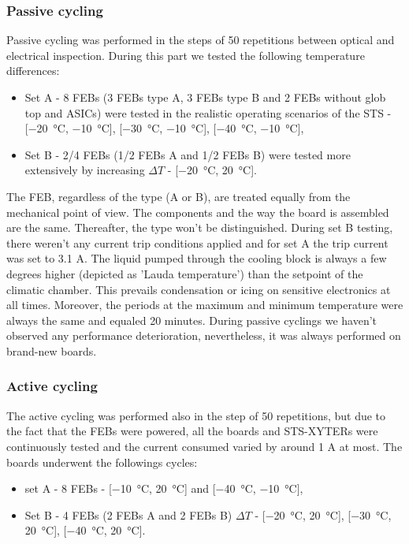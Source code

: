 \subsubsection{Passive cycling}
Passive cycling was performed in the steps of 50 repetitions between optical and electrical inspection. During this part we tested the following temperature differences:
\begin{itemize}
    \item Set A - 8 \glspl{FEB} (3 \glspl{FEB} type A, 3 \glspl{FEB} type B and 2 \glspl{FEB} without glob top and \glspl{ASIC}) were tested in the realistic operating scenarios of the \gls{STS} - [\SI{-20}{\celsius}, \SI{-10}{\celsius}], [\SI{-30}{\celsius}, \SI{-10}{\celsius}], [\SI{-40}{\celsius}, \SI{-10}{\celsius}],
    \item Set B - 2/4 \glspl{FEB} (1/2 \glspl{FEB} A and 1/2 \glspl{FEB} B) were tested more extensively by increasing $\Delta T$ - [\SI{-20}{\celsius}, \SI{20}{\celsius}].
\end{itemize}
The \gls{FEB}, regardless of the type (A or B), are treated equally from the mechanical point of view. The components and the way the board is assembled are the same. Thereafter, the type won't be distinguished. During set B testing, there weren't any current trip conditions applied and for set A the trip current was set to 3.1 A. 
The liquid pumped through the cooling block is always a few degrees higher (depicted as 'Lauda temperature') than the setpoint of the climatic chamber. This prevails condensation or icing on sensitive electronics at all times. Moreover, the periods at the maximum and minimum temperature were always the same and equaled 20 minutes. During passive cyclings we haven't observed any performance deterioration, nevertheless, it was always performed on brand-new boards.

\subsubsection{Active cycling}
The active cycling was performed also in the step of 50 repetitions, but due to the fact that the \glspl{FEB} were powered, all the boards and STS-XYTERs were continuously tested and the current consumed varied by around 1 A at most. The boards underwent the followings cycles:
\begin{itemize}
    \item set A - 8 \glspl{FEB} - [\SI{-10}{\celsius}, \SI{20}{\celsius}] and [\SI{-40}{\celsius}, \SI{-10}{\celsius}],
    \item Set B - 4 \glspl{FEB} (2 \glspl{FEB} A and 2 \glspl{FEB} B)  $\Delta T$ - [\SI{-20}{\celsius}, \SI{20}{\celsius}], [\SI{-30}{\celsius}, \SI{20}{\celsius}], [\SI{-40}{\celsius}, \SI{20}{\celsius}].
\end{itemize}

